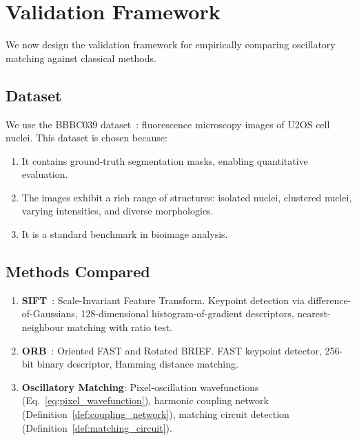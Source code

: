 \documentclass[11pt,twocolumn,a4paper]{article}
\begin{document}
\section{Validation Framework}\label{sec:validation}


We now design the validation framework for empirically comparing oscillatory matching against classical methods.

\subsection{Dataset}

We use the BBBC039 dataset~\citep{bbbc039, caicedo2019}: fluorescence microscopy images of U2OS cell nuclei. This dataset is chosen because:
\begin{enumerate}[label=(\roman*)]
    \item It contains ground-truth segmentation masks, enabling quantitative evaluation.
    \item The images exhibit a rich range of structures: isolated nuclei, clustered nuclei, varying intensities, and diverse morphologies.
    \item It is a standard benchmark in bioimage analysis.
\end{enumerate}

\subsection{Methods Compared}

\begin{enumerate}[label=(\arabic*)]
    \item \textbf{SIFT}~\citep{lowe2004}: Scale-Invariant Feature Transform. Keypoint detection via difference-of-Gaussians, 128-dimensional histogram-of-gradient descriptors, nearest-neighbour matching with ratio test.
    \item \textbf{ORB}~\citep{rublee2011}: Oriented FAST and Rotated BRIEF. FAST keypoint detector, 256-bit binary descriptor, Hamming distance matching.
    \item \textbf{Oscillatory Matching}: Pixel-oscillation wavefunctions (Eq.~\eqref{eq:pixel_wavefunction}), harmonic coupling network (Definition~\ref{def:coupling_network}), matching circuit detection (Definition~\ref{def:matching_circuit}).
\end{enumerate}
\end{document}
